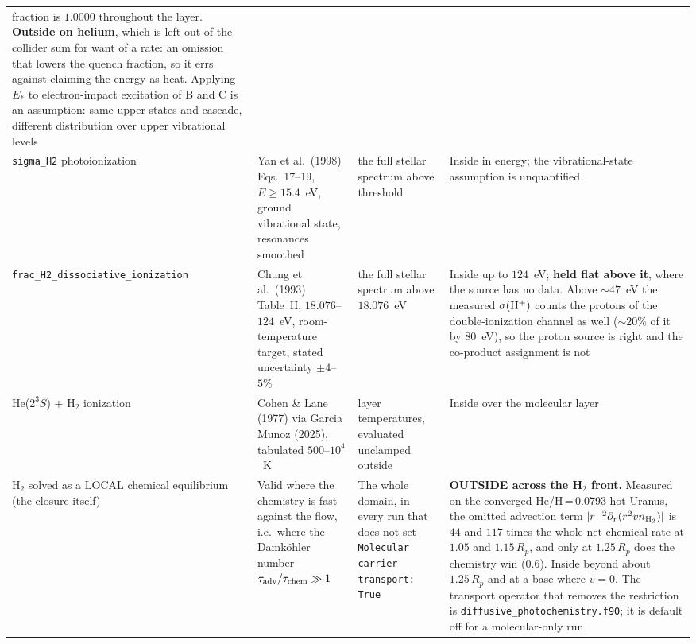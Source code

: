 \documentclass[english,a4paper]{my_memo}
\begin{document}
\begin{longtable}{@{}>{\raggedright\arraybackslash}p{}>{\raggedright\arraybackslash}p{}>{\raggedright\arraybackslash}p{}>{\raggedright\arraybackslash}p{}@{}}
    fraction is $1.0000$ throughout the layer. \textbf{Outside on helium},
    which is left out of the collider sum for want of a rate: an omission
    that lowers the quench fraction, so it errs against claiming the energy
    as heat. Applying $E_*$ to electron-impact excitation of B and C is an
    assumption: same upper states and cascade, different distribution over
    upper vibrational levels \\
\addlinespace
\texttt{sigma\_H2} photoionization
  & Yan et al.\ (1998) Eqs.~17--19, $E \geq 15.4$~eV, ground vibrational
    state, resonances smoothed
  & the full stellar spectrum above threshold
  & Inside in energy; the vibrational-state assumption is unquantified \\
\addlinespace
\texttt{frac\_\allowbreak H2\_\allowbreak dissociative\_\allowbreak ionization}
  & Chung et al.\ (1993) Table~II, $18.076$--$124$~eV, room-temperature
    target, stated uncertainty $\pm4$--$5\%$
  & the full stellar spectrum above $18.076$~eV
  & Inside up to $124$~eV; \textbf{held flat above it}, where the source has
    no data. Above $\sim47$~eV the measured $\sigma({\rm H^+})$ counts the
    protons of the double-ionization channel as well ($\sim20\%$ of it by
    $80$~eV), so the proton source is right and the co-product assignment is
    not \\
\addlinespace
He($2^3S$) $+$ H$_2$ ionization
  & Cohen \& Lane (1977) via Garcia Munoz (2025), tabulated
    $500$--$10^4$~K
  & layer temperatures, evaluated unclamped outside
  & Inside over the molecular layer \\
\addlinespace
H$_2$ solved as a LOCAL chemical equilibrium (the closure itself)
  & Valid where the chemistry is fast against the flow, i.e.\ where the
    Damk\"ohler number $\tau_{\rm adv}/\tau_{\rm chem}\gg 1$
  & The whole domain, in every run that does not set
    \texttt{Molecular carrier transport: True}
  & \textbf{OUTSIDE across the H$_2$ front.} Measured on the converged
    He/H\,=\,0.0793 hot Uranus, the omitted advection term
    $|r^{-2}\partial_r(r^2 v n_{\rm H_2})|$ is $44$ and $117$ times the whole
    net chemical rate at $1.05$ and $1.15\,R_p$, and only at $1.25\,R_p$ does
    the chemistry win ($0.6$). Inside beyond about $1.25\,R_p$ and at a base
    where $v=0$. The transport operator that removes the restriction is
    \texttt{diffusive\_\allowbreak photochemistry.\allowbreak f90}; it is default off for a
    molecular-only run \\
\end{longtable}
\end{document}
